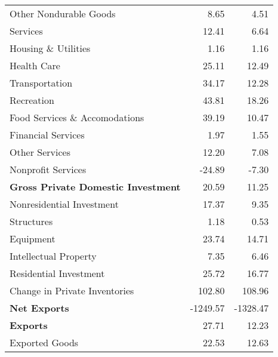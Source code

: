 \documentclass[11pt, letterpaper]{article}\usepackage[]{graphicx}\usepackage[]{color}
\begin{document}
\begin{table}[H]
\begin{tabular}{lrr}
  \hspace{24mm}  Other Nondurable Goods & 8.65 & 4.51 \\ 
  \hspace{8mm}  Services & 12.41 & 6.64 \\ 
  \hspace{16mm}  Housing \& Utilities & 1.16 & 1.16 \\ 
  \hspace{16mm}  Health Care & 25.11 & 12.49 \\ 
  \hspace{16mm}  Transportation & 34.17 & 12.28 \\ 
  \hspace{16mm}  Recreation & 43.81 & 18.26 \\ 
  \hspace{16mm}  Food Services \& Accomodations & 39.19 & 10.47 \\ 
  \hspace{16mm}  Financial Services & 1.97 & 1.55 \\ 
  \hspace{16mm}  Other Services & 12.20 & 7.08 \\ 
  \hspace{16mm}  Nonprofit Services & -24.89 & -7.30 \\ 
  \hspace{0mm} \textbf{Gross Private Domestic Investment} & 20.59 & 11.25 \\ 
  \hspace{8mm}  Nonresidential Investment & 17.37 & 9.35 \\ 
  \hspace{16mm}  Structures & 1.18 & 0.53 \\ 
  \hspace{16mm}  Equipment & 23.74 & 14.71 \\ 
  \hspace{16mm}  Intellectual Property & 7.35 & 6.46 \\ 
  \hspace{8mm}  Residential Investment & 25.72 & 16.77 \\ 
  \hspace{8mm}  Change in Private Inventories & 102.80 & 108.96 \\ 
  \hspace{0mm} \textbf{Net Exports} & -1249.57 & -1328.47 \\ 
  \hspace{0mm} \textbf{Exports} & 27.71 & 12.23 \\ 
  \hspace{8mm}  Exported Goods & 22.53 & 12.63 \\ 

\end{tabular}
\end{table}
\end{document}
